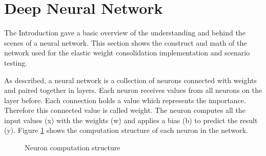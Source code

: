 \section{Deep Neural Network}
\label{foundations_deep_neural_network}

The Introduction gave a basic overview of the understanding and behind the scenes of a neural network.
This section shows the construct and math of the network used for the elastic weight consolidation implementation and scenario testing.

As described, a neural network is a collection of neurons connected with weights and paired together in layers.
Each neuron receives values from all neurons on the layer before.
Each connection holds a value which represents the importance.
Therefore this connected value is called weight.
The neuron computes all the input values (x) with the weights (w) and applies a bias (b) to predict the result (y).
Figure \ref{fig:dnn_node_procedure} shows the computation structure of each neuron in the network.
\cite{math_nn_skalski}

\begin{figure}[H]
    \centering
    \caption{\cite{dnn_neuron_basic_overview} Neuron computation structure}
    \label{fig:dnn_node_procedure}
\end{figure}

